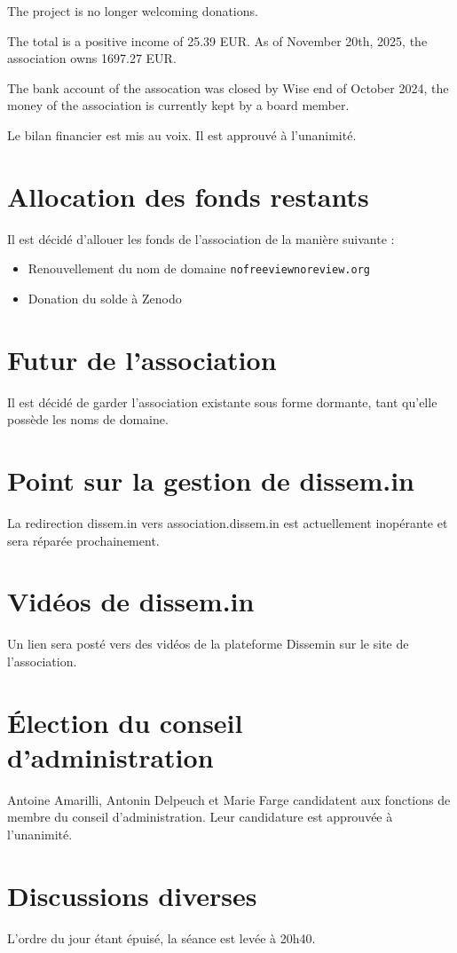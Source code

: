 \documentclass[a4paper]{article}
\begin{document}
The project is no longer welcoming donations.

The total is a positive income of 25.39 EUR. As of November 20th, 2025, the
association owns 1697.27 EUR.

The bank account of the assocation was closed by Wise end of October 2024, the money
of the association is currently kept by a board member.

Le bilan financier est mis au voix. Il est approuvé à l'unanimité.

\section{Allocation des fonds restants}

Il est décidé d'allouer les fonds de l'association de la manière suivante :

\begin{itemize}
  \item Renouvellement du nom de domaine \texttt{nofreeviewnoreview.org}
  \item Donation du solde à Zenodo
\end{itemize}

\section{Futur de l'association}

Il est décidé de garder l'association existante sous forme dormante, tant
qu'elle possède les noms de domaine.

\section{Point sur la gestion de dissem.in}

La redirection dissem.in vers association.dissem.in est actuellement inopérante
et sera réparée prochainement.

\section{Vidéos de dissem.in}

Un lien sera posté vers des vidéos de la plateforme Dissemin sur le site de
l'association.

\section{Élection du conseil d'administration}

Antoine Amarilli, Antonin Delpeuch et Marie Farge candidatent aux fonctions de
membre du conseil d'administration. Leur candidature est approuvée à
l'unanimité.

\section{Discussions diverses}

L'ordre du jour étant épuisé, la séance est levée à 20h40.
\end{document}
